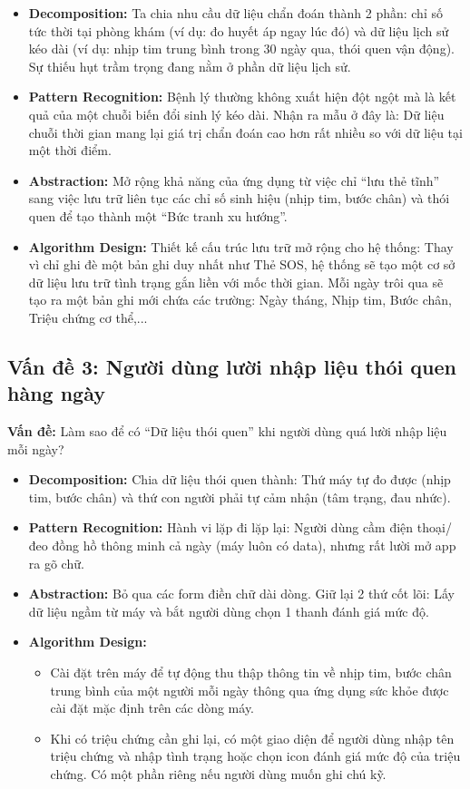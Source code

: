 \documentclass[a4paper,12pt]{article}
\begin{document}
\begin{itemize}
    \item \textbf{Decomposition:} Ta chia nhu cầu dữ liệu chẩn đoán thành 2 phần: chỉ số tức thời tại phòng khám (ví dụ: đo huyết áp ngay lúc đó) và dữ liệu lịch sử kéo dài (ví dụ: nhịp tim trung bình trong 30 ngày qua, thói quen vận động). Sự thiếu hụt trầm trọng đang nằm ở phần dữ liệu lịch sử.
    \item \textbf{Pattern Recognition:} Bệnh lý thường không xuất hiện đột ngột mà là kết quả của một chuỗi biến đổi sinh lý kéo dài. Nhận ra mẫu ở đây là: Dữ liệu chuỗi thời gian mang lại giá trị chẩn đoán cao hơn rất nhiều so với dữ liệu tại một thời điểm.
    \item \textbf{Abstraction:} Mở rộng khả năng của ứng dụng từ việc chỉ ``lưu thẻ tĩnh'' sang việc lưu trữ liên tục các chỉ số sinh hiệu (nhịp tim, bước chân) và thói quen để tạo thành một ``Bức tranh xu hướng''.
    \item \textbf{Algorithm Design:} Thiết kế cấu trúc lưu trữ mở rộng cho hệ thống: Thay vì chỉ ghi đè một bản ghi duy nhất như Thẻ SOS, hệ thống sẽ tạo một cơ sở dữ liệu lưu trữ tình trạng gắn liền với mốc thời gian. Mỗi ngày trôi qua sẽ tạo ra một bản ghi mới chứa các trường: Ngày tháng, Nhịp tim, Bước chân, Triệu chứng cơ thể,...
\end{itemize}

\subsection{Vấn đề 3: Người dùng lười nhập liệu thói quen hàng ngày}

\textbf{Vấn đề:} Làm sao để có ``Dữ liệu thói quen'' khi người dùng quá lười nhập liệu mỗi ngày?

\begin{itemize}
    \item \textbf{Decomposition:} Chia dữ liệu thói quen thành: Thứ máy tự đo được (nhịp tim, bước chân) và thứ con người phải tự cảm nhận (tâm trạng, đau nhức).
    \item \textbf{Pattern Recognition:} Hành vi lặp đi lặp lại: Người dùng cầm điện thoại/đeo đồng hồ thông minh cả ngày (máy luôn có data), nhưng rất lười mở app ra gõ chữ.
    \item \textbf{Abstraction:} Bỏ qua các form điền chữ dài dòng. Giữ lại 2 thứ cốt lõi: Lấy dữ liệu ngầm từ máy và bắt người dùng chọn 1 thanh đánh giá mức độ.
    \item \textbf{Algorithm Design:} 
    \begin{itemize}
        \item Cài đặt trên máy để tự động thu thập thông tin về nhịp tim, bước chân trung bình của một người mỗi ngày thông qua ứng dụng sức khỏe được cài đặt mặc định trên các dòng máy.
        \item Khi có triệu chứng cần ghi lại, có một giao diện để người dùng nhập tên triệu chứng và nhập tình trạng hoặc chọn icon đánh giá mức độ của triệu chứng. Có một phần riêng nếu người dùng muốn ghi chú kỹ.
    \end{itemize}
\end{itemize}
\end{document}
